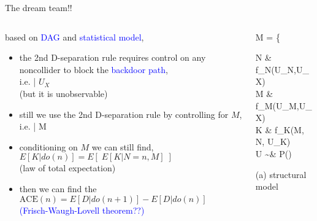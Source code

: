 \begin{frame}
	{The dream team!!}
	\begin{columns}
		\begin{column}{0.5\textwidth}
			based on \textcolor{blue}{DAG} and \textcolor{blue}{statistical model},
			\begin{itemize}
				\item the 2nd D-separation rule requires control on any noncollider to block the \textcolor{blue}{backdoor path}, \\
				i.e.  \; | $U_{X}$ \\
				{\small (but it is unobservable)}
				\item still we use the 2nd D-separation rule by controlling for $M$, \\
				i.e.  \; | M \\
				\item conditioning on $M$ we can still find, \\
				{\small $E[K | do(n)] = E[\; E[K | N=n, M] \;]$} \\
				{\small (law of total expectation)}
				\item then we can find the \\
				{\small $\text{ACE}(n) = E[D | do(n+1)] - E[D | do(n)]$ } \\
				{\small \textcolor{blue}{(Frisch-Waugh-Lovell theorem??)} }
			\end{itemize}
		\end{column}
		\begin{column}{0.5\textwidth}  
			\begin{equ}
				M = \left\{ \begin{aligned} 
					N \leftarrow & \; f_{N}(U_{N},U_{X}) \\
					M \leftarrow & \; f_{M}(U_{M},U_{X}) \\
					K \leftarrow & \; f_{K}(M, N, U_{K}) \\
					U \sim & \; P()
				\end{aligned} \right
				\caption*{(a) structural model}
			\end{equ}
			\begin{figure}
\end{figure}
\end{column}
\end{columns}
\end{frame}
